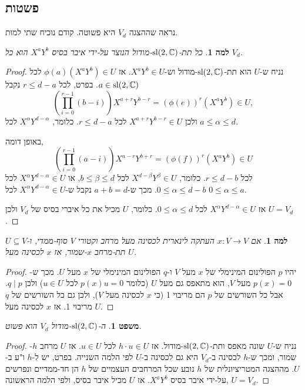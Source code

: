 \documentclass{report}
\theoremstyle{break}
\newtheorem{theorem}{משפט}[chapter]
\newtheorem{lemma}[lemma]{למה}
\newtheorem*{unLemma}{למה}
\theoremstyle{MyNonumberbreak}
\newtheorem{proof}{הוכחה}
\begin{document}
\subsection{פשטות}
נראה שההצגה $V_d$ היא פשוטה. קודם נוכיח שתי למות.
\begin{lemma}
	כל תת-$\operatorname{sl}(2, \operatorname{\mathbb{C}})$-מודול הנוצר על-ידי איבר בסיס $X^aY^b$ הוא כל $V_d$.
\end{lemma}
\begin{proof}
	נניח ש-$U$ הוא תת-$\operatorname{sl}(2, \operatorname{\mathbb{C}})$-מודול וש-$X^aY^b \in U$. אז $\phi(a)(X^aY^b) \in U$ לכל $a \in \operatorname{sl}(2, \operatorname{\mathbb{C}})$. בפרט, לכל $r \le d - a$ נקבל
	\[ (\prod_{i=0}^{r-1} (b - i))X^{a+r}Y^{b-r} = (\phi(e))^r(X^aY^b) \in U, \]
	ולכן $X^{a+r}Y^{b-r} \in U$ לכל $r \le d - a$. כלומר, $X^\alpha Y^{d-\alpha}$ לכל $a \le \alpha \le d$.
	
	באופן דומה, 
	\[ (\prod_{i=0}^{r-1} (a - i))X^{a-r}Y^{b+r} = (\phi(f))^r(X^aY^b) \in U \]
	לכל $r \le d - b$. כלומר, $X^{d-\beta}Y^\beta \in U$ לכל $b \le \beta \le d$, או $X^\alpha Y^{d-\alpha} \in U$ לכל $0 \le \alpha \le d - b$. מכך ש-$a + b = d$ נקבל ש-$X^\alpha Y^{d-\alpha} \in U$ לכל $0 \le \alpha \le a$.
	
	אז $X^\alpha Y^{d-\alpha} \in U$ לכל $0 \le \alpha \le d$. כלומר, $U$ מכיל את כל איברי בסיס של $V_d$ ולכן $U = V_d$.
\end{proof}
\begin{unLemma}
	אם $x : V \to V$ העתקה לינארית לכסינה מעל מרחב וקטורי $V$ סוף-ממדי, ו-$U \subseteq V$ תת-מרחב $x$-שמור, אז $x$ לכסינה מעל $U$.
\end{unLemma}
\begin{proof}	
	יהיו $p$ הפולינום המינימלי של $x$ מעל $V$ ו-$q$ הפולינום המינימלי של $x$ מעל $U$. מכך ש-$p(x) = 0$ מעל $V$, הוא מתאפס גם מעל $U$ (כלומר $p(x)u = 0$ לכל $u \in U$) ולכן $q \mid p$. אבל כל השורשים של $p$ הם מריבוי 1 (כי $x$ לכסינה מעל $V$), ולכן גם כל השורשים של $q$ מריבוי 1. אז $x$ לכסינה מעל $U$.
	
\end{proof}
\begin{theorem}
	ה-$\operatorname{sl}(2, \operatorname{\mathbb{C}})$-מודול $V_d$ הוא פשוט.
\end{theorem}
\begin{proof}
	נניח ש-$U$ שונה מאפס ותת-$\operatorname{sl}(2, \operatorname{\mathbb{C}})$-מודול. אז $h \cdot u \in U$ לכל $u \in U$. אז $U$ מרחב $h$-שמור, ומכך ש-$h$ לכסינה ב-$V_d$ היא גם לכסינה ב-$U$ לפי הלמה השנייה. בפרט, יש ל-$h$ ו"ע ב-$U$. מההצגה המטריציונלית של $h$ נובע שכל המרחבים העצמיים של $h$ הן חד-ממדיים ונפרשים על-ידי איבר בסיס $X^aY^b$. אז $U$ מכיל איבר בסיס, ולפי הלמה הראשונה, $U = V_d$.
\end{proof}
\end{document}
